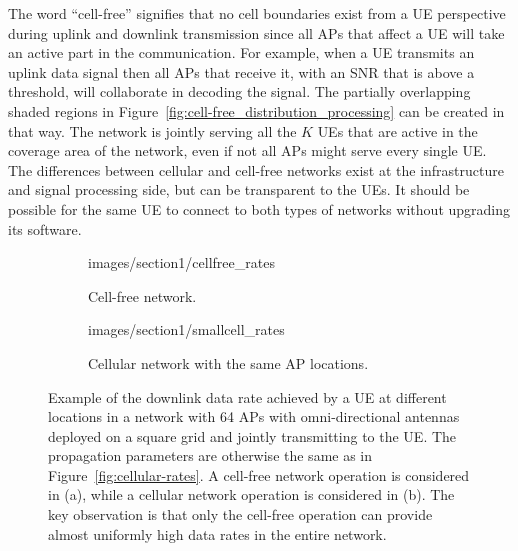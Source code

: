 The word ``cell-free'' signifies that no cell boundaries exist from a \gls{UE} perspective during uplink and downlink transmission since all \glspl{AP} that affect a \gls{UE} will take an active part in the communication. For example, when a \gls{UE} transmits an uplink data signal then all \glspl{AP} that receive it, with an \gls{SNR} that is above a threshold, will collaborate in decoding the signal. The partially overlapping shaded regions in Figure~\ref{fig:cell-free_distribution_processing} can be created in that way.
The network is jointly serving all the $K$ \glspl{UE} that are active in the coverage area of the network, even if not all \glspl{AP} might serve every single \gls{UE}. The differences between cellular and cell-free networks exist at the infrastructure and signal processing side, but can be transparent to the \glspl{UE}. It should be possible for the same \gls{UE} to connect to both types of networks without upgrading its software.


\begin{figure}[t!]
	\centering 
	\begin{subfigure}[b]{\columnwidth} \centering
		\begin{overpic}[width=.8\columnwidth,tics=10]{images/section1/cellfree_rates}
		\end{overpic} 
		\caption{Cell-free network.}    \vspace{+1mm}
	\end{subfigure} 
	\begin{subfigure}[b]{\columnwidth} \centering 
		\begin{overpic}[width=.8\columnwidth,tics=10]{images/section1/smallcell_rates}
		\end{overpic} 
		\caption{Cellular network with the same AP locations.} 
	\end{subfigure} 	
	\caption{Example of the downlink data rate achieved by a \gls{UE} at different locations in a network with 64 \glspl{AP} with omni-directional antennas deployed on a square grid and jointly transmitting to the UE. The propagation parameters are otherwise the same as in Figure~\ref{fig:cellular-rates}. A cell-free network operation is considered in (a), while a cellular network operation is considered in (b). The key observation is that only the cell-free operation can provide almost uniformly high data rates in the entire network.} 
	\label{fig:cellfree-rates} 
\end{figure}




